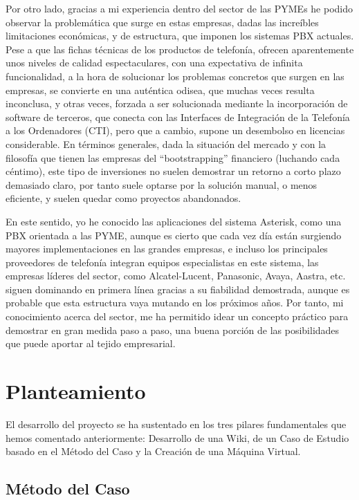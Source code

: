 Por otro lado, gracias a mi experiencia dentro del sector de las PYMEs he podido observar la problemática que surge en estas empresas, dadas las increíbles limitaciones económicas, y de estructura, que imponen los sistemas PBX actuales. Pese a que las fichas técnicas de los productos de telefonía, ofrecen aparentemente unos niveles de calidad espectaculares, con una expectativa de infinita funcionalidad, a la hora de solucionar los problemas concretos que surgen en las empresas, se convierte en una auténtica odisea, que muchas veces resulta inconclusa, y otras veces, forzada a ser solucionada mediante la incorporación de software de terceros, que conecta con las Interfaces de Integración de la Telefonía a los Ordenadores (CTI), pero que a cambio, supone un desembolso en licencias considerable. En términos generales, dada la situación del mercado y con la filosofía que tienen las empresas del ``bootstrapping'' financiero (luchando cada céntimo), este tipo de inversiones no suelen demostrar un retorno a corto plazo demasiado claro, por tanto suele optarse por la solución manual, o menos eficiente, y suelen quedar como proyectos abandonados.

En este sentido, yo he conocido las aplicaciones del sistema Asterisk, como una PBX orientada a las PYME, aunque es cierto que cada vez día están surgiendo mayores implementaciones en las grandes empresas, e incluso los principales proveedores de telefonía integran equipos especialistas en este sistema, las empresas líderes del sector, como Alcatel-Lucent, Panasonic, Avaya, Aastra, etc. siguen dominando en primera línea gracias a su fiabilidad demostrada, aunque es probable que esta estructura vaya mutando en los próximos años. Por tanto, mi conocimiento acerca del sector, me ha permitido idear un concepto práctico para demostrar en gran medida paso a paso, una buena porción de las posibilidades que puede aportar al tejido empresarial.

\section{Planteamiento}

El desarrollo del proyecto se ha sustentado en los tres pilares fundamentales que hemos comentado anteriormente: Desarrollo de una Wiki, de un Caso de Estudio basado en el Método del Caso y la Creación de una Máquina Virtual.

\subsection{Método del Caso}

